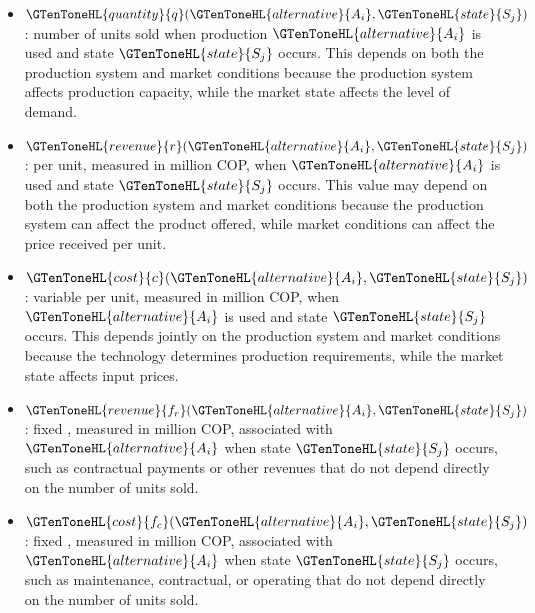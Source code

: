 \begin{itemize}
	\item $\GTenToneHL{quantity}{q}(\GTenToneHL{alternative}{A_i},\GTenToneHL{state}{S_j})$: number of units sold when production 
	$\GTenToneHL{alternative}{A_i}$ is used and state $\GTenToneHL{state}{S_j}$ occurs. This  depends on both the
	production system and market conditions because the production system
	affects production capacity, while the market state affects the level of
	demand.
	
	\item $\GTenToneHL{revenue}{r}(\GTenToneHL{alternative}{A_i},\GTenToneHL{state}{S_j})$:  per unit, measured in million COP, when
	 $\GTenToneHL{alternative}{A_i}$ is used and state $\GTenToneHL{state}{S_j}$ occurs. This value may depend
	on both the production system and market conditions because the production
	system can affect the product offered, while market conditions can affect
	the price received per unit.
	
	\item $\GTenToneHL{cost}{c}(\GTenToneHL{alternative}{A_i},\GTenToneHL{state}{S_j})$: variable  per unit, measured in million COP, when
	 $\GTenToneHL{alternative}{A_i}$ is used and state $\GTenToneHL{state}{S_j}$ occurs. This  depends jointly
	on the production system and market conditions because the technology
	determines production requirements, while the market state affects input
	prices.
	
	\item $\GTenToneHL{revenue}{f_r}(\GTenToneHL{alternative}{A_i},\GTenToneHL{state}{S_j})$: fixed , measured in million COP, associated
	with  $\GTenToneHL{alternative}{A_i}$ when state $\GTenToneHL{state}{S_j}$ occurs, such as contractual
	payments or other revenues that do not depend directly on the number of
	units sold.
	
	\item $\GTenToneHL{cost}{f_c}(\GTenToneHL{alternative}{A_i},\GTenToneHL{state}{S_j})$: fixed , measured in million COP, associated
	with  $\GTenToneHL{alternative}{A_i}$ when state $\GTenToneHL{state}{S_j}$ occurs, such as maintenance,
	contractual, or operating  that do not depend directly on the number
	of units sold.
\end{itemize}

